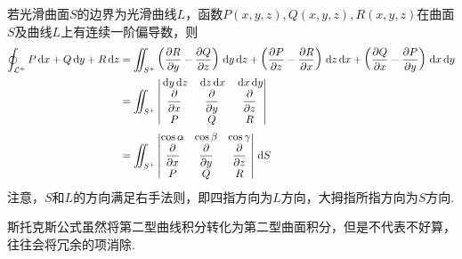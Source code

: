 \begin{theorem}
若光滑曲面$S$的边界为光滑曲线$L$，函数$P(x,y,z),Q(x,y,z),R(x,y,z)$在曲面$S$及曲线$L$上有连续一阶偏导数，则
\[\begin{aligned}
\oint_{\mL^+} P\diff x+Q\diff y+R\diff z&=\iint_{S^+}\lrp{\pd{R}{y}-\pd{Q}{z}}\diff y\diff z+\lrp{\pd{P}{z}-\pd{R}{x}}\diff z\diff x+\lrp{\pd{Q}{x}-\pd{P}{y}}\diff x\diff y\\
&=\iint_{S^+}\vmat{\diff y\diff z&\diff z\diff x&\diff x\diff y\\\pd{}{x}&\pd{}{y}&\pd{}{z}\\P&Q&R}\\
&=\iint_{S^+}\vmat{\cos\alpha&\cos\beta&\cos\gamma\\\pd{}{x}&\pd{}{y}&\pd{}{z}\\P&Q&R}\diff S
\end{aligned}\]
注意，$S$和$L$的方向满足右手法则，即四指方向为$L$方向，大拇指所指方向为$S$方向.
\end{theorem}
\par 斯托克斯公式虽然将第二型曲线积分转化为第二型曲面积分，但是不代表不好算，往往会将冗余的项消除.

